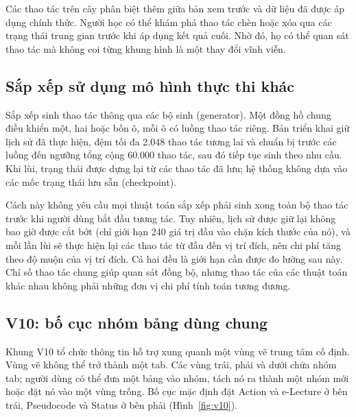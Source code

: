 \documentclass[11pt,a4paper]{article}
\begin{document}
Các thao tác trên cây phân biệt thêm giữa bản xem trước và dữ liệu đã được áp dụng chính thức. Người học có thể khám phá thao tác chèn hoặc xóa qua các trạng thái trung gian trước khi áp dụng kết quả cuối. Nhờ đó, họ có thể quan sát thao tác mà không coi từng khung hình là một thay đổi vĩnh viễn.
\FloatBarrier

\subsection{Sắp xếp sử dụng mô hình thực thi khác}
Sắp xếp sinh thao tác thông qua các bộ sinh (generator). Một đồng hồ chung điều khiển một, hai hoặc bốn ô, mỗi ô có luồng thao tác riêng. Bản triển khai giữ lịch sử đã thực hiện, đệm tối đa 2.048 thao tác tương lai và chuẩn bị trước các luồng đến ngưỡng tổng cộng 60.000 thao tác, sau đó tiếp tục sinh theo nhu cầu. Khi lùi, trạng thái được dựng lại từ các thao tác đã lưu; hệ thống không dựa vào các mốc trạng thái lưu sẵn (checkpoint).

Cách này không yêu cầu mọi thuật toán sắp xếp phải sinh xong toàn bộ thao tác trước khi người dùng bắt đầu tương tác. Tuy nhiên, lịch sử được giữ lại không bao giờ được cắt bớt (chỉ giới hạn 240 giá trị đầu vào chặn kích thước của nó), và mỗi lần lùi sẽ thực hiện lại các thao tác từ đầu đến vị trí đích, nên chi phí tăng theo độ muộn của vị trí đích. Cả hai đều là giới hạn cần được đo lường sau này. Chỉ số thao tác chung giúp quan sát đồng bộ, nhưng thao tác của các thuật toán khác nhau không phải những đơn vị chi phí tính toán tương đương.

\page
\subsection{V10: bố cục nhóm bảng dùng chung}\label{sec:v10}
Khung V10 tổ chức thông tin hỗ trợ xung quanh một vùng vẽ trung tâm cố định. Vùng vẽ không thể trở thành một tab. Các vùng trái, phải và dưới chứa nhóm tab; người dùng có thể đưa một bảng vào nhóm, tách nó ra thành một nhóm mới hoặc đặt nó vào một vùng trống. Bố cục mặc định đặt Action và e-Lecture ở bên trái, Pseudocode và Status ở bên phải (Hình~\ref{fig:v10}).
\end{document}
